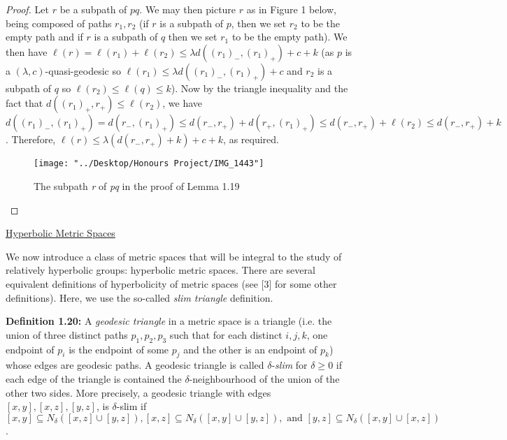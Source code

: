 \documentclass[12pt]{article}
\newcommand{\vs}{\vskip10pt}
\begin{document}
 	\begin{proof}
 		
 		Let $r$ be a subpath of $pq$. We may then picture $r$ as in Figure 1 below, being composed of paths $r_1, r_2$ (if $r$ is a subpath of $p$, then we set $r_2$ to be the empty path and if $r$ is a subpath of $q$ then we set $r_1$ to be the empty path). We then have $\ell(r) = \ell(r_1) + \ell(r_2) \leq \lambda d((r_1)_{-}, (r_1)_{+}) + c + k$ (as $p$ is a $(\lambda, c)$-quasi-geodesic so $\ell(r_1) \leq \lambda d((r_1)_{-}, (r_1)_{+}) + c$ and $r_2$ is a subpath of $q$ so $\ell(r_2) \leq \ell(q) \leq k$). Now by the triangle inequality and the fact that $d((r_1)_+, r_+) \leq \ell(r_2)$, we have $d((r_1)_{-}, (r_1)_+) = d(r_-, (r_1)_+) \leq d(r_-, r_+) + d(r_+, (r_1)_+) \leq d(r_-, r_+) + \ell(r_2) \leq d(r_-, r_+) + k$. Therefore, $\ell(r) \leq \lambda (d(r_-, r_+) + k) + c + k$, as required. 
 		
 		
 		
\begin{figure} [H]
	\centering
	\texttt{[image: "../Desktop/Honours Project/IMG\_1443"]}
	\caption{The subpath \textit{r} of \textit{pq} in the proof of Lemma 1.19}
	\label{fig:img1443}
\end{figure}
 	\end{proof}
 	
 	\vs
 	
	\underline{Hyperbolic Metric Spaces}
	
	\vs 
	
	We now introduce a class of metric spaces that will be integral to the study of relatively hyperbolic groups: hyperbolic metric spaces. There are several equivalent definitions of hyperbolicity of metric spaces (see [3] for some other definitions). Here, we use the so-called \textit{slim triangle} definition. 
	
	\vs 
	
	\textbf{Definition 1.20: } A \textit{geodesic triangle} in a metric space is a triangle (i.e. the union of three distinct paths $p_1, p_2, p_3$ such that for each distinct $i,j,k$, one endpoint of $p_i$ is the endpoint of some $p_j$ and the other is an endpoint of $p_k$) whose edges are geodesic paths. A geodesic triangle is called $\delta$-\textit{slim} for $\delta \geq 0$ if each edge of the triangle is contained the $\delta$-neighbourhood of the union of the other two sides. More precisely, a geodesic triangle with edges $[x,y], [x,z], [y,z]$, is $\delta$-slim if $[x,y] \subseteq N_{\delta} ([x,z] \cup [y,z]), [x,z] \subseteq N_{\delta} ([x,y] \cup [y,z]), \text{ and } [y,z] \subseteq N_{\delta} ([x,y] \cup [x,z])$.
	
\end{document}
